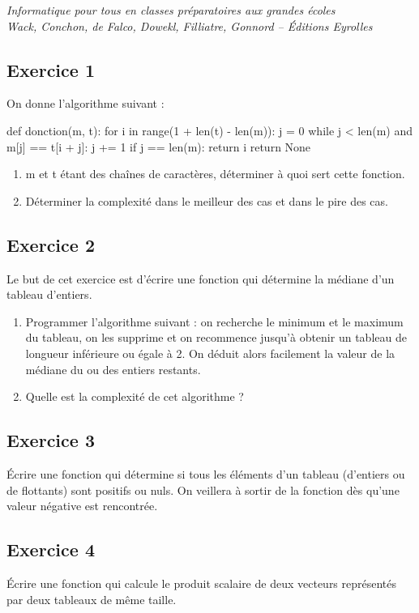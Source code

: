 \documentclass[10pt]{article}
\begin{document}

\begin{center}
\textit{Informatique pour tous en classes préparatoires aux grandes écoles\\
Wack, Conchon, de Falco, Dowekl, Filliatre, Gonnord -- Éditions Eyrolles}
\end{center}

 \renewcommand{\baselinestretch}{1.2}
\setlength{\parskip}{2ex plus 0.5ex minus 0.2ex}



\subsection*{Exercice 1}
On donne l'algorithme suivant :

\begin{py}
\begin{python}
def donction(m, t):
    for i in range(1 + len(t) - len(m)):
        j = 0
        while j < len(m) and m[j] == t[i + j]:
            j += 1
        if j == len(m):
            return i
        return None
\end{python}
\end{py}
\begin{enumerate}
\item \textsf{m} et \textsf{t} étant des chaînes de caractères, déterminer à quoi sert cette fonction.
\item Déterminer la complexité dans le meilleur des cas et dans le pire des cas.
\end{enumerate}

\subsection*{Exercice 2}

Le but de cet exercice est d’écrire une fonction qui détermine la médiane d’un tableau
d’entiers.
\begin{enumerate}
\item Programmer l’algorithme suivant : on recherche le minimum et le maximum du tableau, on les supprime et on recommence jusqu’à obtenir un tableau de longueur inférieure ou égale à 2. On déduit alors facilement la valeur de la médiane du ou des entiers restants.
\item Quelle est la complexité de cet algorithme ? 
\end{enumerate}

\subsection*{Exercice 3}

Écrire une fonction qui détermine si tous les éléments d’un tableau (d’entiers ou de flottants)
sont positifs ou nuls. On veillera à sortir de la fonction dès qu’une valeur négative est rencontrée.

\subsection*{Exercice 4}

Écrire une fonction qui calcule le produit scalaire de deux vecteurs représentés par deux
tableaux de même taille.
\end{document}

